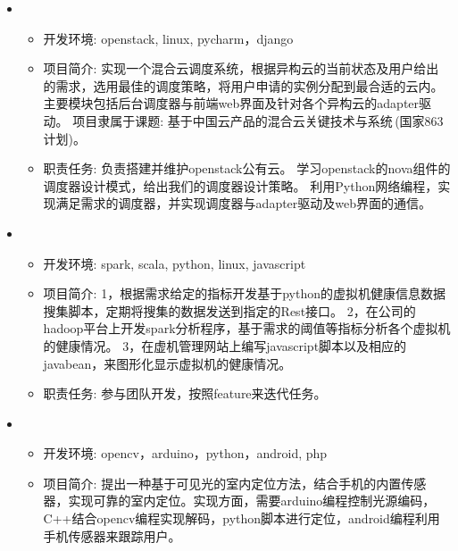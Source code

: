   \begin{itemize}[leftmargin=*]
    \item
      {\small
      \begin{itemize}
        \item 开发环境: openstack, linux, pycharm，django
        \item 项目简介: 实现一个混合云调度系统，根据异构云的当前状态及用户给出的需求，选用最佳的调度策略，将用户申请的实例分配到最合适的云内。主要模块包括后台调度器与前端web界面及针对各个异构云的adapter驱动。
        项目隶属于课题: 基于中国云产品的混合云关键技术与系统$\,$(国家863计划)。
        \item 职责任务: 
	        \subitem 负责搭建并维护openstack公有云。
	        \subitem 学习openstack的nova组件的调度器设计模式，给出我们的调度器设计策略。
	        \subitem 利用Python网络编程，实现满足需求的调度器，并实现调度器与adapter驱动及web界面的通信。
      \end{itemize}
      }
  \item
  {\small
     	\begin{itemize}
     		\item 开发环境: spark, scala, python, linux, javascript
     		\item 项目简介: 
     		1，根据需求给定的指标开发基于python的虚拟机健康信息数据搜集脚本，定期将搜集的数据发送到指定的Rest接口。
     		2，在公司的hadoop平台上开发spark分析程序，基于需求的阈值等指标分析各个虚拟机的健康情况。
     		3，在虚机管理网站上编写javascript脚本以及相应的javabean，来图形化显示虚拟机的健康情况。
     		\item 职责任务: 参与团队开发，按照feature来迭代任务。
     	\end{itemize}
  }
    \item
      {\small
      \begin{itemize}
        \item 开发环境: opencv，arduino，python，android, php 
        \item 项目简介: 提出一种基于可见光的室内定位方法，结合手机的内置传感器，实现可靠的室内定位。实现方面，需要arduino编程控制光源编码，C++结合opencv编程实现解码，python脚本进行定位，android编程利用手机传感器来跟踪用户。

\end{itemize}}
\end{itemize}
